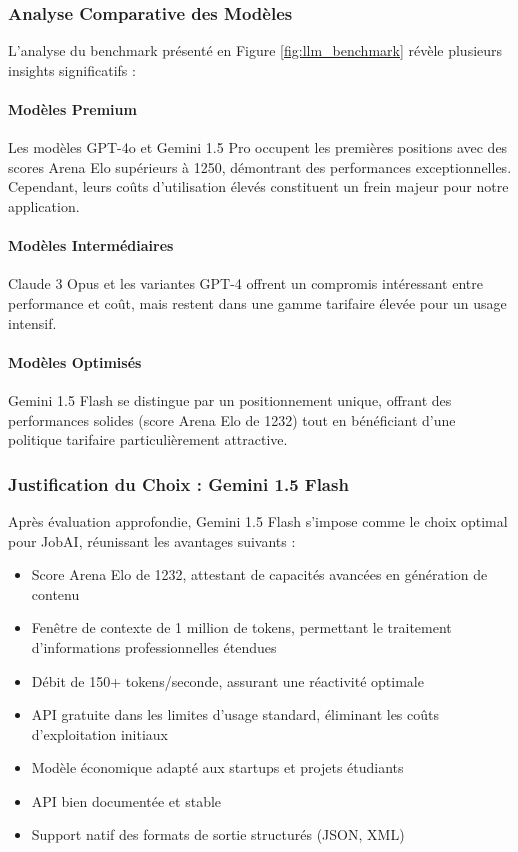 \subsubsection{Analyse Comparative des Modèles}

L'analyse du benchmark présenté en Figure \ref{fig:llm_benchmark} révèle plusieurs insights significatifs :

\paragraph{Modèles Premium} Les modèles GPT-4o et Gemini 1.5 Pro occupent les premières positions avec des scores Arena Elo supérieurs à 1250, démontrant des performances exceptionnelles. Cependant, leurs coûts d'utilisation élevés constituent un frein majeur pour notre application.

\paragraph{Modèles Intermédiaires} Claude 3 Opus et les variantes GPT-4 offrent un compromis intéressant entre performance et coût, mais restent dans une gamme tarifaire élevée pour un usage intensif.

\paragraph{Modèles Optimisés} Gemini 1.5 Flash se distingue par un positionnement unique, offrant des performances solides (score Arena Elo de 1232) tout en bénéficiant d'une politique tarifaire particulièrement attractive.

\subsubsection{Justification du Choix : Gemini 1.5 Flash}

Après évaluation approfondie, Gemini 1.5 Flash s'impose comme le choix optimal pour JobAI, réunissant les avantages suivants :

\begin{itemize}
    \item Score Arena Elo de 1232, attestant de capacités avancées en génération de contenu
    \item Fenêtre de contexte de 1 million de tokens, permettant le traitement d'informations professionnelles étendues
    \item Débit de 150+ tokens/seconde, assurant une réactivité optimale
    \item API gratuite dans les limites d'usage standard, éliminant les coûts d'exploitation initiaux
    \item Modèle économique adapté aux startups et projets étudiants
    \item API bien documentée et stable
    \item Support natif des formats de sortie structurés (JSON, XML)
\end{itemize}


